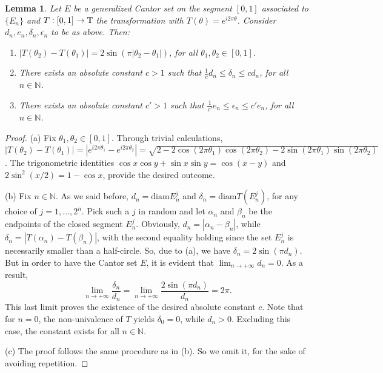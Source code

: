 \documentclass[12pt]{amsart}
\newtheorem{lemma}[theorem]{Lemma}
\theoremstyle{definition}\newtheorem{remark}[theorem]{Remark}
\theoremstyle{definition}\newtheorem{example}[theorem]{Example}
\theoremstyle{definition}\newtheorem{definition}{Definition}
\numberwithin{equation}{section}
\newcommand\TT{{\mathbb T}}
\begin{document}
\begin{lemma}\label{lem:relation of Cantor sets}
    Let $E$ be a generalized Cantor set on the segment $[0,1]$ associated to $\{E_n\}$ and $T\vcentcolon[0,1]\to\TT$ the transformation with $T(\theta)=e^{i2\pi\theta}$. Consider $d_n,e_n,\delta_n,\epsilon_n$ to be as above. Then:
    \begin{enumerate}
        \item[\textup{(a)}] $|T(\theta_2)-T(\theta_1)|=2\sin(\pi|\theta_2-\theta_1|)$, for all $\theta_1,\theta_2\in[0,1]$.
        \item[\textup{(b)}] There exists an absolute constant $c>1$ such that $\frac{1}{c}d_n \le \delta_n \le c d_n$, for all $n\in\mathbb{N}$.
        \item[\textup{(c)}] There exists an absolute constant $c'>1$ such that $\frac{1}{c'}e_n \le \epsilon_n \le c' e_n$, for all $n\in\mathbb{N}$.
    \end{enumerate}
\end{lemma}
\begin{proof}
    (a) Fix $\theta_1,\theta_2\in[0,1]$. Through trivial calculations, $|T(\theta_2)-T(\theta_1)|=|e^{i2\pi\theta_1}-e^{i2\pi\theta_2}|=\sqrt{2-2\cos(2\pi\theta_1)\cos(2\pi\theta_2)-2\sin(2\pi\theta_1)\sin(2\pi\theta_2)}$. The trigonometric identities $\cos x \cos y+\sin x\sin y=\cos(x-y)$ and $2\sin^2(x/2)=1-\cos x$, provide the desired outcome. 

    (b) Fix $n\in\mathbb{N}$. As we said before, $d_n=\mathrm{diam}E_n^j$ and $\delta_n=\mathrm{diam}T(E_n^j)$, for any choice of $j=1,\dots,2^n$. Pick such a $j$ in random and let $\alpha_n$ and $\beta_n$ be the endpoints of the closed segment $E_n^j$. Obviously, $d_n=|\alpha_n-\beta_n|$, while $\delta_n=|T(\alpha_n)-T(\beta_n)|$, with the second equality holding since the set $E_n^j$ is necessarily smaller than a half-circle. So, due to (a), we have $\delta_n=2\sin(\pi d_n)$. But in order to have the Cantor set $E$, it is evident that $\lim_{n\to+\infty}d_n=0$. As a result,
    \begin{equation*}
        \lim_{n\to+\infty}\frac{\delta_n}{d_n}=\lim_{n\to+\infty}\frac{2\sin(\pi d_n)}{d_n}=2\pi.
    \end{equation*}
    This last limit proves the existence of the desired absolute constant $c$. Note that for $n=0$, the non-univalence of $T$ yields $\delta_0=0$, while $d_n>0$. Excluding this case, the constant exists for all $n\in\mathbb{N}$.

    (c) The proof follows the same procedure as in (b). So we omit it, for the sake of avoiding repetition.
\end{proof}
\end{document}
